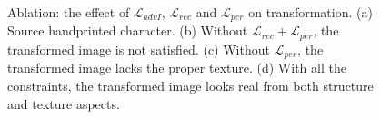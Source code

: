 \documentclass[10pt,journal,compsoc,twocolumn ]{IEEEtran}
\begin{document}
\begin{figure}
\centering
{}
\hspace{0.2cm}
\hspace{0.2cm}
\hspace{0.2cm}
\caption{Ablation: the effect of $\mathcal{L}_{advI}$, $\mathcal{L}_{rec}$ and $\mathcal{L}_{per}$ on transformation. (a) Source handprinted character. (b) Without $\mathcal{L}_{rec}+\mathcal{L}_{per}$, the transformed image is not satisfied. (c) Without $\mathcal{L}_{per}$, the transformed image lacks the proper texture. (d) With all the constraints, the transformed image looks real from both structure and texture aspects.}
\label{ablation_transform} %
\end{figure}
\end{document}
